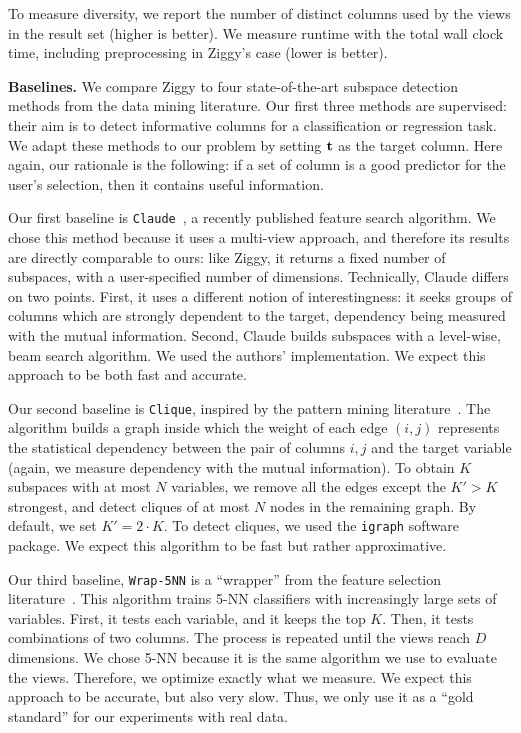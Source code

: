 To measure diversity, we report the number of distinct columns used by the
views in the result set (higher is better). We measure runtime with the total
wall clock time, including preprocessing in Ziggy's case (lower is better).

\textbf{Baselines.} We compare Ziggy to four state-of-the-art subspace
detection methods from the data mining literature. Our first three methods are
supervised: their aim is to detect informative columns for a classification or
regression task.  We adapt these methods to our problem by setting $\bf{t}$ as
the target column. Here again, our rationale is the following: if a set of
column is a good predictor for the user's selection, then it contains useful
information.

Our first baseline is \texttt{Claude}~\cite{Sellam2015Semi}, a recently
published feature search algorithm. We chose this method because it uses a
multi-view approach, and therefore its results are directly comparable to ours:
like Ziggy, it returns a fixed number of subspaces, with a user-specified
number of dimensions.  Technically, Claude differs on two points. First, it
uses a different notion of interestingness: it seeks groups of columns which
are strongly dependent to the target, dependency being measured with the mutual
information. Second, Claude builds subspaces with a level-wise, beam search
algorithm. We used the authors' implementation.  We expect this approach to be
both fast and accurate.

Our second baseline is \texttt{Clique}, inspired by the pattern mining
literature~\cite{xie2010max}. The algorithm builds a graph inside which the
weight of each edge $(i,j)$ represents the statistical dependency between the
pair of columns $i,j$ and the target variable (again, we measure dependency
with the mutual information). To obtain $K$ subspaces with at most $N$
variables, we remove all the edges except the $K' > K$ strongest, and detect
cliques of at most $N$ nodes in the remaining graph. By default, we set $K' =
2\cdot K$. To detect cliques, we used the \texttt{igraph} software package. We
expect this algorithm to be fast but rather approximative.

Our third baseline, \texttt{Wrap-5NN} is a ``wrapper'' from the feature
selection literature~\cite{guyon2003introduction}. This algorithm trains 5-NN
classifiers with increasingly large sets of variables. First, it tests each
variable, and it keeps the top $K$. Then, it tests combinations of two columns.
The process is repeated until the views reach $D$ dimensions. We chose 5-NN
because it is the same algorithm we use to evaluate the views. Therefore, we
optimize exactly what we measure. We expect this approach to be accurate, but
also very slow. Thus, we only use it as a ``gold standard'' for our experiments
with real data.


